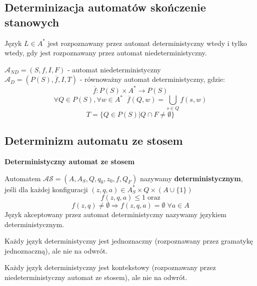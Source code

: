 \documentclass[12pt]{article}
\begin{document}
        \subsection{Determinizacja automatów skończenie stanowych}

        \begin{theorem}
            Język $L \in A^*$ jest rozpoznawany przez automat deterministyczny wtedy
            i tylko wtedy, gdy jest rozpoznawany przez automat niedeterministyczny.
        \end{theorem}

        $\mathcal{A}_{ND} = (S, f, I, F)$ - automat niedeterministyczny\\
        \indent$\mathcal{A}_D = (P(S), \overline{f}, I, T)$ - równoważny automat deterministyczny, gdzie:
        $$\overline{f} : P(S) \times A^* \rightarrow P(S)$$
        $$\forall Q \in P(S), \forall w \in A^* \; \; \overline{f}(Q, w) = \bigcup\limits_{s \in Q} f(s, w)$$
        $$T = \{Q \in P(S) | Q \cap F \neq \emptyset\}$$

        \subsection{Determinizm automatu ze stosem}

        \begin{definition}
            \textbf{Deterministyczny automat ze stosem}

            Automatem $\mathcal{AS} = (A, A_S, Q, q_0, z_0, f, Q_F)$ nazywamy
            \textbf{deterministycznym}, jeśli dla każdej konfiguracji 
            $(z, q, a) \in A_S^* \times Q \times (A \cup \{1\})$
            $$f(z, q, a) \leq 1 \; \mathrm{oraz}$$
            $$f(z, q) \neq \emptyset \Rightarrow f(z, q, a) = \emptyset \; \forall a \in A$$
            Język akceptowany przez automat deterministyczny nazywamy językiem deterministycznym.
        \end{definition}

        \begin{theorem}
            Każdy język deterministyczny jest jednoznaczny (rozpoznawany przez gramatykę jednoznaczną), ale nie na odwrót.
        \end{theorem}
        
        \begin{theorem}
            Każdy język deterministyczny jest kontekstowy (rozpoznawany przez niedeterministyczny automat ze stosem), ale nie na odwrót.
        \end{theorem}
\end{document}
